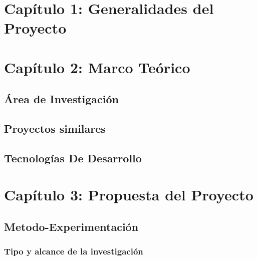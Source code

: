 \documentclass{extbook}
\begin{document}


\tableofcontents
\listoffigures
\listoftables

\chapter{Capítulo 1: Generalidades del Proyecto}







\chapter{Capítulo 2: Marco Teórico}
\section{Área de Investigación}






\section{Proyectos similares}

\section{Tecnologías De Desarrollo}


\chapter{Capítulo 3: Propuesta del Proyecto}
\section{Metodo-Experimentación}
\subsection{Tipo y alcance de la investigación}

\end{document}
